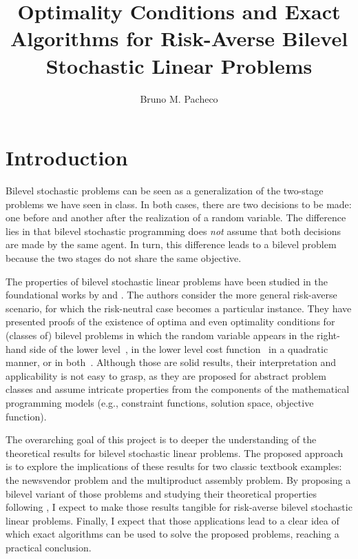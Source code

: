 \documentclass[12pt]{article}
\begin{document}
\title{Optimality Conditions and Exact Algorithms for Risk-Averse Bilevel Stochastic Linear Problems}

\author{Bruno M. Pacheco}

\maketitle

\section*{Introduction}

Bilevel stochastic problems can be seen as a generalization of the two-stage problems we have seen in class.
In both cases, there are two decisions to be made: one before and another after the realization of a random variable.
The difference lies in that bilevel stochastic programming does \emph{not} assume that both decisions are made by the same agent.
In turn, this difference leads to a bilevel problem because the two stages do not share the same objective.

The properties of bilevel stochastic linear problems have been studied in the foundational works by \citet{burtscheidtRiskAverseModelsBilevel2020} and \citet{clausExistenceSolutionsClass2022a,clausContinuityRiskaverseBilevel2021}.
The authors consider the more general risk-averse scenario, for which the risk-neutral case becomes a particular instance.
They have presented proofs of the existence of optima and even optimality conditions for (classes of) bilevel problems in which the random variable appears in the right-hand side of the lower level~\citep{burtscheidtRiskAverseModelsBilevel2020}, in the lower level cost function~\citep{clausContinuityRiskaverseBilevel2021} in a quadratic manner, or in both~\citep{clausExistenceSolutionsClass2022a}.
Although those are solid results, their interpretation and applicability is not easy to grasp, as they are proposed for abstract problem classes and assume intricate properties from the components of the mathematical programming models (e.g., constraint functions, solution space, objective function).

The overarching goal of this project is to deeper the understanding of the theoretical results for bilevel stochastic linear problems.
The proposed approach is to explore the implications of these results for two classic textbook examples: the newsvendor problem and the multiproduct assembly problem.
By proposing a bilevel variant of those problems and studying their theoretical properties following \citet{burtscheidtRiskAverseModelsBilevel2020}, I expect to make those results tangible for risk-averse bilevel stochastic linear problems.
Finally, I expect that those applications lead to a clear idea of which exact algorithms can be used to solve the proposed problems, reaching a practical conclusion.



% 
\printbibliography
    
\end{document}
